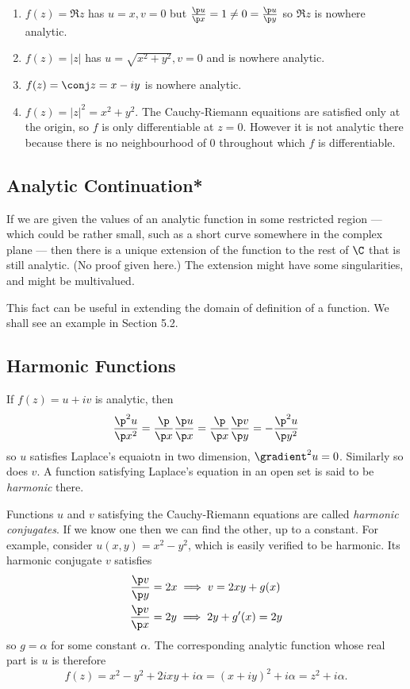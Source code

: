 \documentclass[a4paper]{article}
\begin{document}
\begin{eg}\leavevmode
  \begin{enumerate}
  \item \(f(z) = \Re z\) has \(u = x, v = 0\) but \(\frac{\p u}{\p x} = 1 \neq 0 = \frac{\p u}{\p y}\) so \(\Re z\) is nowhere analytic.
  \item \(f(z) = |z|\) has \(u = \sqrt{x^2 + y^2}, v = 0\) and is nowhere analytic.
  \item \(f(z) = \conj z = x - iy\) is nowhere analytic.
  \item \(f(z) = |z|^2 = x^2 + y^2\). The Cauchy-Riemann equaitions are satisfied only at the origin, so \(f\) is only differentiable at \(z = 0\). However it is not analytic there because there is no neighbourhood of \(0\) throughout which \(f\) is differentiable.
  \end{enumerate}
\end{eg}

\subsection{Analytic Continuation*}

If we are given the values of an analytic function in some restricted region --- which could be rather small, such as a short curve somewhere in the complex plane --- then there is a unique extension of the function to the rest of \(\C\) that is still analytic. (No proof given here.) The extension might have some singularities, and might be multivalued.

This fact can be useful in extending the domain of definition of a function. We shall see an example in Section 5.2.

\subsection{Harmonic Functions}

If \(f(z) = u + iv\) is analytic, then
\[
  \frac{\p^2 u}{\p x^2} = \frac{\p}{\p x} \frac{\p u}{\p x} = \frac{\p}{\p x} \frac{\p v}{\p y} = -\frac{\p^2 u}{\p y^2}
\]
so \(u\) satisfies Laplace's equaiotn in two dimension, \(\gradient^2 u = 0\). Similarly so does \(v\). A function satisfying Laplace's equation in an open set is said to be \emph{harmonic} there.

Functions \(u\) and \(v\) satisfying the Cauchy-Riemann equations are called \emph{harmonic conjugates}. If we know one then we can find the other, up to a constant. For example, consider \(u(x, y) = x^2 - y^2\), which is easily verified to be harmonic. Its harmonic conjugate \(v\) satisfies
\begin{align*}
  \frac{\p v}{\p y} &= 2x \implies v = 2xy + g(x) \\
  \frac{\p v}{\p x} &= 2y \implies 2y + g'(x) = 2y
\end{align*}
so \(g = \alpha\) for some constant \(\alpha\). The corresponding analytic function whose real part is \(u\) is therefore
\[
  f(z) = x^2 - y^2 + 2ixy + i\alpha = (x + iy)^2 + i\alpha = z^2 + i\alpha.
\]
\end{document}
